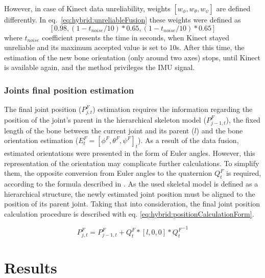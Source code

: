 \documentclass[sensors,article,submit,moreauthors,pdftex,10pt,a4paper]{mdpi}
\begin{document}
	However, in case of Kinect data unreliability, weights $[w_\phi , w_\theta , w_\psi]$ are defined differently. In eq.~\ref{eq:hybrid:unreliableFusion} these weights were defined as $$[0.98,(1-t_{noise}/10)*0.65,(1-t_{noise}/10)*0.65]$$ where $t_{noise}$ coefficient presents the time in seconds, when Kinect stayed unreliable and its maximum accepted value is set to 10s. After this time, the estimation of the new bone orientation (only around two axes) stops, until Kinect is available again, and the method privileges the IMU signal.
		
	\subsubsection{Joints final position estimation}
	The final joint position ($P_{j,t}^F$) estimation requires the information regarding the position of the joint’s parent in the hierarchical skeleton model ($P_{j-1,t}^F$), the fixed length of the bone between the current joint and its parent ($l$) and the bone orientation estimation ($E_t^F=[\phi^F,\theta^F,\psi^F]_t$). As a result of the data fusion, estimated orientations were presented in the form of Euler angles. However, this representation of the orientation may complicate further calculations. To simplify them, the opposite conversion from Euler angles to the quaternion $Q_t^F$ is required, according to the formula described in \cite{Dunn2011}. As the used skeletal model is defined as a hierarchical structure, the newly estimated joint position must be aligned to the position of its parent joint. Taking that into consideration, the final joint position calculation procedure is described with eq. \ref{eq:hybrid:positionCalculationForm}.
		
	\begin{equation} 	
		P_{j,t}^F=P_{j-1,t}^F+Q_t^F*[l,0,0]*{Q_t^F}^{-1}     
		\label{eq:hybrid:positionCalculationForm}              	
	\end{equation}
		
	\section{Results}
		
		
\end{document}
